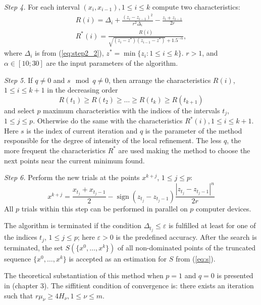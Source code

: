 \documentclass{llncs}
\DeclareMathOperator{\sign}{sign}
\begin{document}
\textit{Step 4.} For each interval \((x_i,x_{i-1}),1\leqslant i\leqslant k\) compute two
characteristics:
\begin{eqnarray}
  R(i) = \Delta_i + \frac{(z_i-z_{i-1})^2}{r^2\Delta_i}-\frac{z_i+z_{i-1}}{2r} \\
  R^*(i)=\frac{R(i)}{\sqrt{(z_i-z^*)(z_{i-1}-z^*)} + 1.5^{-\alpha}},
\end{eqnarray}
where \(\Delta_i\) is from (\ref{eq:step2_2}), \(z^*=\min\{z_i:1\leqslant i\leqslant k\}\). \(r>1\),
and \(\alpha\in [10;30]\) are the input parameters of the algorithm.

\textit{Step 5.} If \(q\not=0\) and \(s \mod q\not=0 \), then arrange the characteristics \(R(i)\),
\(1 \leqslant i \leqslant k + 1\) in the decreasing order
\begin{equation*}
  R(t_1) \geqslant R(t_2) \geqslant \dots \geqslant R(t_k) \geqslant R(t_{k+1})
\end{equation*}
and select \(p\) maximum characteristics with the indices of the intervals \(t_j\), \(1 \leqslant j
\leqslant p\). Otherwise do the same with the characteristics \(R^*(i),1\leqslant i\leqslant k+1\).
Here \(s\) is the index of current iteration and \(q\) is the parameter of the method responsible
for the degree of intensity of the local refinement. The less \(q\), the more frequent the
characteristics \(R^*\) are used making the method to choose the next points near the current
minimum found.

\textit{Step 6.} Perform the new trials at the points \(x^{k+j}\), \(1 \leqslant j \leqslant p\):
\begin{equation}
  x^{k+j}=\frac{x_{t_j}+x_{t_j-1}}{2} - \sign(z_{t_j} - z_{t_j-1})\frac{|z_{t_j} - z_{t_j-
1}|^n}{2r}
\end{equation}
All \(p\) trials within this step can be performed in parallel on \(p\) computer devices.

The algorithm is terminated if the condition \(\Delta_{t_j}\leqslant \varepsilon\) is fulfilled at
least for one of the indices \(t_j\), \(1\leqslant j\leqslant p\); here \(\varepsilon >0\) is the
predefined accuracy.
After the search is terminated, the set \(S(\{x^0,\dots ,x^k\})\) of all
non-dominated points of the truncated sequence \(\{x^0,\dots ,x^k\}\) is accepted as an
estimation for \(S\) from (\ref{eq:s}).

The theoretical substantiation of this method when \(p=1\) and \(q=0\) is presented in
\cite{strOptBook}(chapter 3). The siffitient condition of convergence is: there exists an
iteration such that \(r\mu_\nu \geqslant 4H_\nu, 1\leqslant \nu \leqslant m\).
\end{document}
